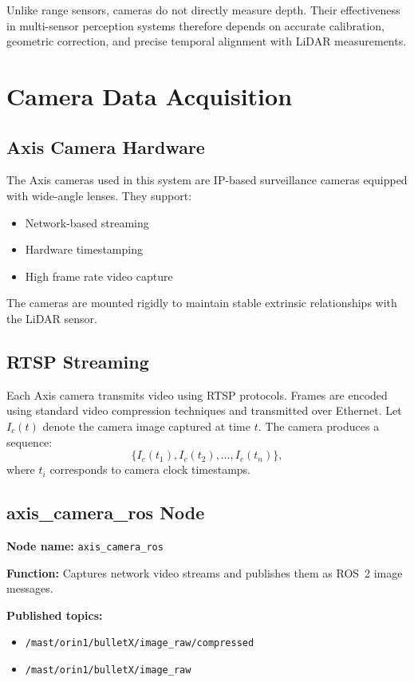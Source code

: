 \documentclass[12pt,a4paper]{report}
\begin{document}
Unlike range sensors, cameras do not directly measure depth. Their effectiveness in multi-sensor perception systems therefore depends on accurate calibration, geometric correction, and precise temporal alignment with LiDAR measurements.

\section{Camera Data Acquisition}
\subsection{Axis Camera Hardware}
The Axis cameras used in this system are IP-based surveillance cameras equipped with wide-angle lenses. They support:
\begin{itemize}
    \item Network-based streaming
    \item Hardware timestamping
    \item High frame rate video capture
\end{itemize}
The cameras are mounted rigidly to maintain stable extrinsic relationships with the LiDAR sensor.

\subsection{RTSP Streaming}
Each Axis camera transmits video using RTSP protocols. Frames are encoded using standard video compression techniques and transmitted over Ethernet. Let $I_c(t)$ denote the camera image captured at time $t$. The camera produces a sequence:
\begin{equation}
\{ I_c(t_1), I_c(t_2), \dots, I_c(t_n) \},
\end{equation}
where $t_i$ corresponds to camera clock timestamps.

\subsection{axis\_camera\_ros Node}
\textbf{Node name:} \texttt{axis\_camera\_ros}

\textbf{Function:} Captures network video streams and publishes them as ROS~2 image messages.

\textbf{Published topics:}
\begin{itemize}
    \item \texttt{/mast/orin1/bulletX/image\_raw/compressed}
    \item \texttt{/mast/orin1/bulletX/image\_raw}
\end{itemize}
\end{document}
